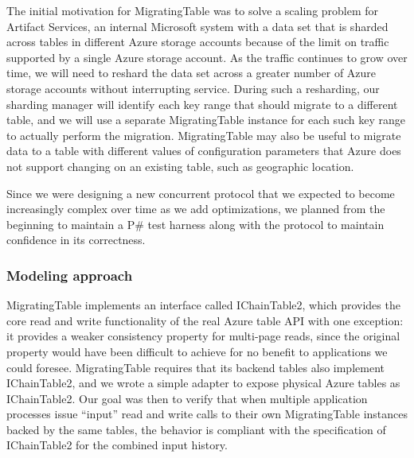 \documentclass{sig-alternate}
\newcommand{\psharp}{P\#\xspace}
\begin{document}
The initial motivation for MigratingTable was to solve a scaling problem for Artifact Services, an internal Microsoft system with a data set that is sharded across tables in different Azure storage accounts because of the limit on traffic supported by a single Azure storage account.  As the traffic continues to grow over time, we will need to reshard the data set across a greater number of Azure storage accounts without interrupting service.  During such a resharding, our sharding manager will identify each key range that should migrate to a different table, and we will use a separate MigratingTable instance for each such key range to actually perform the migration.  MigratingTable may also be useful to migrate data to a table with different values of configuration parameters that Azure does not support changing on an existing table, such as geographic location.

Since we were designing a new concurrent protocol that we expected to become increasingly complex over time as we add optimizations, we planned from the beginning to maintain a \psharp test harness along with the protocol to maintain confidence in its correctness.

\subsubsection{Modeling approach}

MigratingTable implements an interface called IChainTable2, which provides the core read and write functionality of the real Azure table API with one exception: it provides a weaker consistency property for multi-page reads, since the original property would have been difficult to achieve for no benefit to applications we could foresee.  MigratingTable requires that its backend tables also implement IChainTable2, and we wrote a simple adapter to expose physical Azure tables as IChainTable2.  Our goal was then to verify that when multiple application processes issue ``input'' read and write calls to their own MigratingTable instances backed by the same tables, the behavior is compliant with the specification of IChainTable2 for the combined input history.
\end{document}
